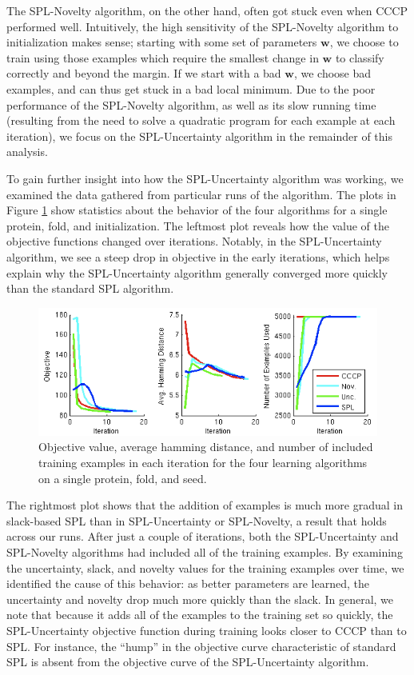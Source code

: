 \documentclass{article}
\begin{document}
The SPL-Novelty algorithm, on the other hand, often got stuck even when CCCP performed well. Intuitively, the high sensitivity of the SPL-Novelty algorithm to initialization makes sense; starting with some set of parameters $\textbf{w}$, we choose to train using those examples which require the smallest change in $\textbf{w}$ to classify correctly and beyond the margin. If we start with a bad $\textbf{w}$, we choose bad examples, and can thus get stuck in a bad local minimum. Due to the poor performance of the SPL-Novelty algorithm, as well as its slow running time (resulting from the need to solve a quadratic program for each example at each iteration), we focus on the SPL-Uncertainty algorithm in the remainder of this analysis.

To gain further insight into how the SPL-Uncertainty algorithm was working, we examined the data gathered  from particular runs of the algorithm. The plots in Figure \ref{fig:exrun} show statistics about the behavior of the four algorithms for a single protein, fold, and initialization. The leftmost plot reveals how the value of the objective functions changed over iterations. Notably, in the SPL-Uncertainty algorithm, we see a steep drop in objective in the early iterations, which helps explain why the SPL-Uncertainty algorithm generally converged more quickly than the standard SPL algorithm. 

\begin{figure}
\includegraphics[scale = 0.7]{ExampleMotifRun_WithNovelty_small2.png}
\caption{Objective value, average hamming distance, and number of included training examples in each iteration for the four learning algorithms on a single protein, fold, and seed.}
\label{fig:exrun}
\end{figure}

The rightmost plot shows that the addition of examples is much more gradual in slack-based SPL than in SPL-Uncertainty or SPL-Novelty, a result that holds across our runs. After just a couple of iterations, both the SPL-Uncertainty and SPL-Novelty algorithms had included all of the training examples. By examining the uncertainty, slack, and novelty values for the training examples over time, we identified the cause of this behavior: as better parameters are learned, the uncertainty and novelty drop much more quickly than the slack. In general, we note that because it adds all of the examples to the training set so quickly, the SPL-Uncertainty objective function during training looks closer to CCCP than to SPL. For instance, the ``hump'' in the objective curve characteristic of standard SPL is absent from the objective curve of the SPL-Uncertainty algorithm.
\end{document}

